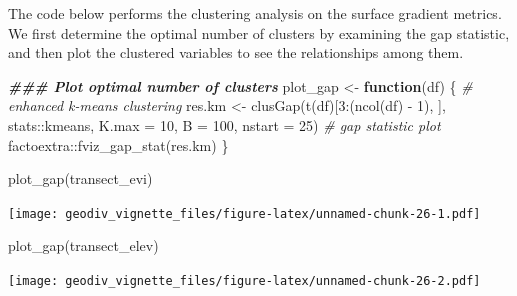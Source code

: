 \documentclass[
]{article}
\newenvironment{Shaded}{\begin{snugshade}}{\end{snugshade}}
\newcommand{\AttributeTok}[1]{\textcolor[rgb]{0.77,0.63,0.00}{#1}}
\newcommand{\CommentTok}[1]{\textcolor[rgb]{0.56,0.35,0.01}{\textit{#1}}}
\newcommand{\ControlFlowTok}[1]{\textcolor[rgb]{0.13,0.29,0.53}{\textbf{#1}}}
\newcommand{\DecValTok}[1]{\textcolor[rgb]{0.00,0.00,0.81}{#1}}
\newcommand{\DocumentationTok}[1]{\textcolor[rgb]{0.56,0.35,0.01}{\textbf{\textit{#1}}}}
\newcommand{\FunctionTok}[1]{\textcolor[rgb]{0.00,0.00,0.00}{#1}}
\newcommand{\NormalTok}[1]{#1}
\newcommand{\OtherTok}[1]{\textcolor[rgb]{0.56,0.35,0.01}{#1}}
\newcommand{\SpecialCharTok}[1]{\textcolor[rgb]{0.00,0.00,0.00}{#1}}
\begin{document}
The code below performs the clustering analysis on the surface gradient
metrics. We first determine the optimal number of clusters by examining
the gap statistic, and then plot the clustered variables to see the
relationships among them.

\begin{Shaded}
\begin{Highlighting}[]
\DocumentationTok{\#\#\# Plot optimal number of clusters}
\NormalTok{plot\_gap }\OtherTok{\textless{}{-}} \ControlFlowTok{function}\NormalTok{(df) \{}
  \CommentTok{\# enhanced k{-}means clustering}
\NormalTok{  res.km }\OtherTok{\textless{}{-}} \FunctionTok{clusGap}\NormalTok{(}\FunctionTok{t}\NormalTok{(df)[}\DecValTok{3}\SpecialCharTok{:}\NormalTok{(}\FunctionTok{ncol}\NormalTok{(df) }\SpecialCharTok{{-}} \DecValTok{1}\NormalTok{), ], stats}\SpecialCharTok{::}\NormalTok{kmeans, }\AttributeTok{K.max =} \DecValTok{10}\NormalTok{, }
                    \AttributeTok{B =} \DecValTok{100}\NormalTok{, }\AttributeTok{nstart =} \DecValTok{25}\NormalTok{)}
  \CommentTok{\# gap statistic plot}
\NormalTok{  factoextra}\SpecialCharTok{::}\FunctionTok{fviz\_gap\_stat}\NormalTok{(res.km)}
\NormalTok{\}}

\FunctionTok{plot\_gap}\NormalTok{(transect\_evi)}
\end{Highlighting}
\end{Shaded}

\texttt{[image: geodiv\_vignette\_files/figure-latex/unnamed-chunk-26-1.pdf]}

\begin{Shaded}
\begin{Highlighting}[]
\FunctionTok{plot\_gap}\NormalTok{(transect\_elev)}
\end{Highlighting}
\end{Shaded}

\texttt{[image: geodiv\_vignette\_files/figure-latex/unnamed-chunk-26-2.pdf]}
\end{document}
